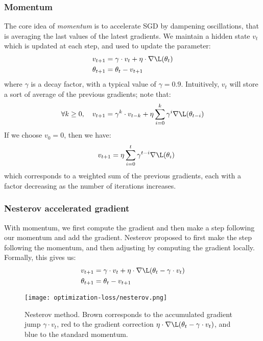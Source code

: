 \subsubsection{Momentum}
The core idea of \emph{momentum} is to accelerate SGD by dampening oscillations, that is averaging the last values of the latest gradients. We maintain a hidden state $v_t$ which is updated at each step, and used to update the parameter:
\begin{equation*}
    \begin{aligned}
        v_{t+1} &= \gamma\cdot v_t+\eta\cdot\nabla\L(\theta_t)\\
        \theta_{t+1} &= \theta_t - v_{t+1}
    \end{aligned}
\end{equation*}
where $\gamma$ is a decay factor, with a typical value of $\gamma=0.9$. Intuitively, $v_t$ will store a sort of average of the previous gradients; note that:
\begin{equation*}
    \forall k\geq 0, \quad v_{t+1} = \gamma^k\cdot v_{t-k} + \eta\sum_{i=0}^k \gamma^i \nabla\L(\theta_{t-i})
\end{equation*}
If we choose $v_0=0$, then we have:
\begin{equation*}
    \quad v_{t+1} = \eta\sum_{i=0}^t \gamma^{t-i} \nabla\L(\theta_i)
\end{equation*}
which corresponds to a weighted sum of the previous gradients, each with a factor decreasing as the number of iterations increases.

\subsubsection{Nesterov accelerated gradient}
With momentum, we first compute the gradient and then make a step following our momentum and add the gradient. Nesterov proposed to first make the step following the momentum, and then adjusting by computing the gradient locally. Formally, this gives us:
\begin{equation*}
    \begin{aligned}
        v_{t+1} &= \gamma\cdot v_t + \eta\cdot\nabla\L(\theta_t-\gamma\cdot v_t)\\
        \theta_{t+1} &= \theta_t - v_{t+1}
    \end{aligned}
\end{equation*}
\begin{figure}[H]
    \centering
    \texttt{[image: optimization-loss/nesterov.png]}
    \caption{Nesterov method. Brown corresponds to the accumulated gradient jump $\gamma\cdot v_t$, red to the gradient correction $\eta\cdot\nabla\L(\theta_t-\gamma\cdot v_t)$, and blue to the standard momentum.}
\end{figure}

